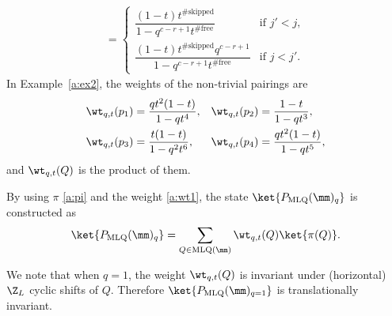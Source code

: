 \begin{description}
\begin{align}
=
 \begin{cases}
\dfrac{(1-t)t^{\#\text{skipped}}}{1-q^{c-r+1}t^{\#\text{free}}}
& \text{if $j'<j$}, \\[.7em]
\dfrac{(1-t)t^{\#\text{skipped}}q^{c-r+1}}{1-q^{c-r+1}t^{\#\text{free}}}
& \text{if $j<j'$}.
\end{cases}
\label{a:wt2}
\end{align}
%
In Example~\ref{a:ex2}, the weights of the non-trivial pairings are
\begin{equation}
\begin{aligned}
\wt_{q,t}(p_1) & = \frac{qt^2(1-t)}{1-qt^4},
&
\wt_{q,t}(p_2) & = \frac{1-t}{1-qt^3},
\\
\wt_{q,t}(p_3) &= \frac{t(1-t)}{1-q^2t^6},
&
\wt_{q,t}(p_4) &= \frac{qt^2(1-t)}{1-qt^5},
\end{aligned}
\end{equation}
and $\wt_{q,t}(Q)$ is the product of them. 

\item[Step 3] By using $\pi$ \eqref{a:pi} and the weight  \eqref{a:wt1}, 
the state $\ket{P_{\text{MLQ}}(\mm)_q}$ is constructed as 
\begin{equation}\label{Smlq}
\ket{P_{\text{MLQ}}(\mm)_q}
= \sum_{Q \in \text{MLQ}(\mm)}
\wt_{q,t}(Q)\ket{\pi(Q)}.
\end{equation}
\end{description}

We note that when $q=1$, the weight $\wt_{q,t}(Q)$ is invariant under (horizontal) $\Z_L$ cyclic shifts of $Q$.
Therefore $\ket{P_{\text{MLQ}}(\mm)_{q=1}}$ is translationally invariant. 


